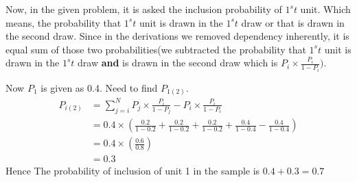 \documentclass{article}
\begin{document}
Now, in the given problem, it is asked the inclusion probability of $1^st$ unit. Which means, the probability that $1^st$ unit is drawn in the $1^st$ draw or that is drawn in the second draw. Since in the derivations we removed dependency inherently, it is equal sum of those two probabilities(we subtracted the probability that $1^st$ unit is drawn in the $1^st$ draw \textbf{and} is drawn in the second draw which is $P_i \times \frac{P_i}{1-P_i})$.\par
Now $P_1$ is given as 0.4. Need to find $P_{1(2)}$.
\begin{align*}
    P_{i(2)} &= \sum_{j=i}^N P_j \times \frac{P_i}{1-P_j} - P_i \times \frac{P_i}{1-P_i}\\
    &= 0.4 \times \left (\frac{0.2}{1-0.2} + \frac{0.2}{1-0.2} + \frac{0.2}{1-0.2} + \frac{0.4}{1-0.4} - \frac{0.4}{1-0.4} \right)\\
    &= 0.4 \times \left (\frac{0.6}{0.8} \right)\\
    &=0.3
\end{align*}
Hence The probability of inclusion of unit 1 in the sample is $0.4+0.3 = 0.7$
\end{document}

